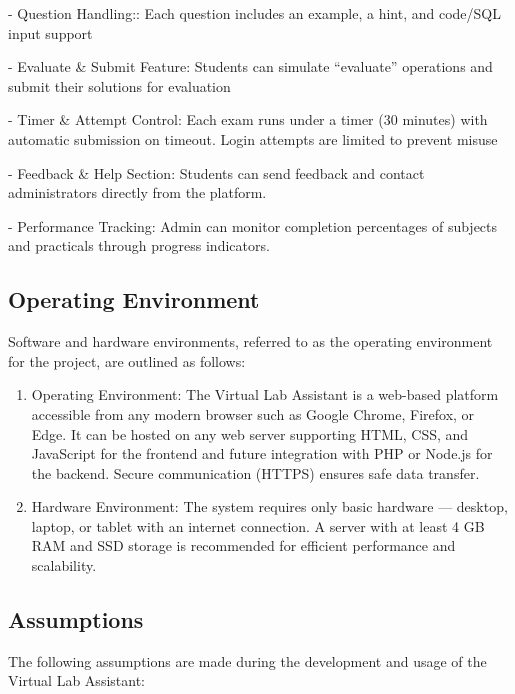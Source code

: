\item- Question Handling:: Each question includes an example, a hint, and code/SQL input support  

\item- Evaluate & Submit Feature: Students can simulate “evaluate” operations and submit their solutions for evaluation

\item- Timer & Attempt Control: Each exam runs under a timer (30 minutes) with automatic submission on timeout. Login attempts are limited to prevent misuse
\item- Feedback & Help Section: Students can send feedback and contact administrators directly from the platform.
\item- Performance Tracking: Admin can monitor completion percentages of subjects and practicals through progress indicators.

\subsection{Operating Environment}
Software and hardware environments, referred to as the operating environment for the project, are outlined as follows:


\begin{enumerate}
  \item	Operating Environment:
The Virtual Lab Assistant is a web-based platform accessible from any modern browser such as Google Chrome, Firefox, or Edge.
It can be hosted on any web server supporting HTML, CSS, and JavaScript for the frontend and future integration with PHP or Node.js for the backend.
Secure communication (HTTPS) ensures safe data transfer.


 
  \item	Hardware Environment:
The system requires only basic hardware — desktop, laptop, or tablet with an internet connection.
A server with at least 4 GB RAM and SSD storage is recommended for efficient performance and scalability.




\end{enumerate}
\newpage
\subsection{Assumptions} 
The following assumptions are made during the development and usage of the Virtual Lab Assistant:

